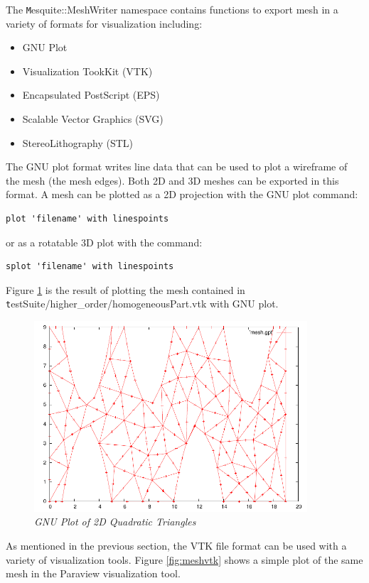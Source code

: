 The {\texttt Mesquite::MeshWriter} namespace contains functions to export mesh in a variety of formats for visualization including:
\begin{itemize}
\item GNU Plot
\item Visualization TookKit (VTK)
\item Encapsulated PostScript (EPS)
\item Scalable Vector Graphics (SVG)
\item StereoLithography (STL)
\end{itemize}
The GNU plot format writes line data that can be used to plot a wireframe of the mesh (the mesh edges).	 Both 2D and 3D meshes can be exported in this format.	A mesh can be plotted as a 2D projection with the GNU plot command:
\begin{verbatim}
plot 'filename' with linespoints
\end{verbatim}
or as a rotatable 3D plot with the command:
\begin{verbatim}
splot 'filename' with linespoints
\end{verbatim}
Figure \ref{fig:meshgpt} is the result of plotting the mesh contained in {\texttt testSuite/higher\_order/homogeneousPart.vtk} with GNU plot.

\begin{figure}[htb!]
\begin{center}
\includegraphics[width=4in]{figures/mesh_gpt}
\caption{\em GNU Plot of 2D Quadratic Triangles \label{fig:meshgpt}}
\end{center}
\end{figure}

As mentioned in the previous section, the VTK file format can be used with a variety of visualization tools.  Figure \ref{fig:meshvtk} shows a simple plot of the same mesh in the Paraview visualization tool.

